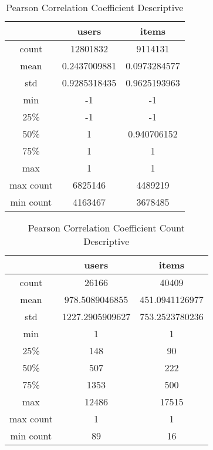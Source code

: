\begin{table}[H]
\centering
\caption{Pearson Correlation Coefficient Descriptive}
\label{table:pearson_corr_coef_descriptive}
\begin{tabular}{|c|c|c|}
\hline
          & \textbf{users} & \textbf{items} \\ \hline
count     & 12801832       & 9114131        \\ \hline
mean      & 0.2437009881   & 0.0973284577   \\ \hline
std       & 0.9285318435   & 0.9625193963   \\ \hline
min       & -1             & -1             \\ \hline
25\%      & -1             & -1             \\ \hline
50\%      & 1              & 0.940706152    \\ \hline
75\%      & 1              & 1              \\ \hline
max       & 1              & 1              \\ \hline
max count & 6825146        & 4489219        \\ \hline
min count & 4163467        & 3678485        \\ \hline
\end{tabular}
\end{table}

\begin{table}[H]
\centering
\caption{Pearson Correlation Coefficient Count Descriptive}
\label{table:pearson_corr_coef_boxplot}
\begin{tabular}{|c|c|c|}
\hline
          & \textbf{users}  & \textbf{items} \\ \hline
count     & 26166           & 40409          \\ \hline
mean      & 978.5089046855  & 451.0941126977 \\ \hline
std       & 1227.2905909627 & 753.2523780236 \\ \hline
min       & 1               & 1              \\ \hline
25\%      & 148             & 90             \\ \hline
50\%      & 507             & 222            \\ \hline
75\%      & 1353            & 500            \\ \hline
max       & 12486           & 17515          \\ \hline
max count & 1               & 1              \\ \hline
min count & 89              & 16             \\ \hline
\end{tabular}
\end{table}

